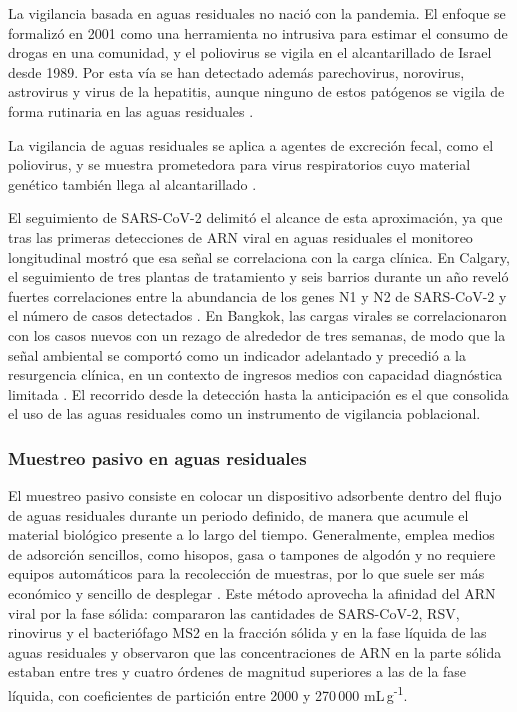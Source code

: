 La vigilancia basada en aguas residuales no nació con la pandemia. El enfoque se formalizó en 2001 como una herramienta no intrusiva para estimar el consumo de drogas en una comunidad, y el poliovirus se vigila en el alcantarillado de Israel desde 1989. Por esta vía se han detectado además parechovirus, norovirus, astrovirus y virus de la hepatitis, aunque ninguno de estos patógenos se vigila de forma rutinaria en las aguas residuales \cite{Subedi_2019}.

La vigilancia de aguas residuales se aplica a agentes de excreción fecal, como el poliovirus, y se muestra prometedora para virus respiratorios cuyo material genético también llega al alcantarillado \cite{Parkins_2023}.

El seguimiento de SARS-CoV-2 delimitó el alcance de esta aproximación, ya que tras las primeras detecciones de ARN viral en aguas residuales \cite{Ahmed_2020,Medema_2020} el monitoreo longitudinal mostró que esa señal se correlaciona con la carga clínica. En Calgary, el seguimiento de tres plantas de tratamiento y seis barrios durante un año reveló fuertes correlaciones entre la abundancia de los genes N1 y N2 de SARS-CoV-2 y el número de casos detectados \cite{Acosta_2022}. En Bangkok, las cargas virales se correlacionaron con los casos nuevos con un rezago de alrededor de tres semanas, de modo que la señal ambiental se comportó como un indicador adelantado y precedió a la resurgencia clínica, en un contexto de ingresos medios con capacidad diagnóstica limitada \cite{Sangsanont_2022}. El recorrido desde la detección hasta la anticipación es el que consolida el uso de las aguas residuales como un instrumento de vigilancia poblacional.

\subsubsection{Muestreo pasivo en aguas residuales}

El muestreo pasivo consiste en colocar un dispositivo adsorbente dentro del flujo de aguas residuales durante un periodo definido, de manera que acumule el material biológico presente a lo largo del tiempo. Generalmente, emplea medios de adsorción sencillos, como hisopos, gasa o tampones de algodón y no requiere equipos automáticos para la recolección de muestras, por lo que suele ser más económico y sencillo de desplegar \cite{Parkins_2023}. Este método aprovecha la afinidad del ARN viral por la fase sólida:  compararon las cantidades de SARS-CoV-2, RSV, rinovirus y el bacteriófago MS2 en la fracción sólida y en la fase líquida de las aguas residuales y observaron que las concentraciones de ARN en la parte sólida estaban entre tres y cuatro órdenes de magnitud superiores a las de la fase líquida, con coeficientes de partición entre 2000 y 270\,000 mL\,g\textsuperscript{-1}.

